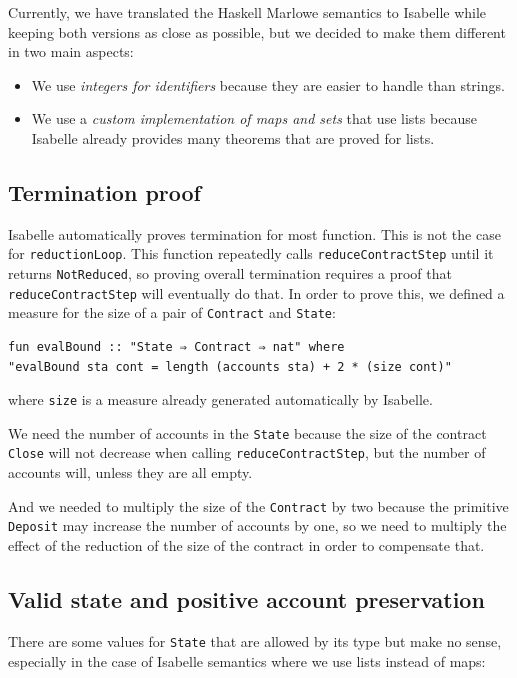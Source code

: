 \documentclass[runningheads]{llncs}
\begin{document}
Currently, we have translated the Haskell Marlowe semantics to Isabelle while keeping both versions as close as possible, but we decided to make them different in two main aspects:

\begin{itemize}
    \item We use \emph{integers for identifiers} because they are easier to handle than strings.
    \item We use a \emph{custom implementation of maps and sets} that use lists because Isabelle already provides many theorems that are proved for lists.
\end{itemize}

\subsection{Termination proof}

Isabelle automatically proves termination for most function. This is not the case for \texttt{reductionLoop}. This function repeatedly calls \texttt{reduceContractStep} until it returns \texttt{NotReduced}, so proving overall termination requires a proof that \texttt{reduceContractStep} will eventually do that. In order to prove this, we defined a measure for the size of a pair of \texttt{Contract} and \texttt{State}:

\begin{verbatim}
fun evalBound :: "State ⇒ Contract ⇒ nat" where
"evalBound sta cont = length (accounts sta) + 2 * (size cont)"
\end{verbatim}
\noindent
where \texttt{size} is a measure already generated automatically by Isabelle.

We need the number of accounts in the \texttt{State} because the size of the contract \texttt{Close} will not decrease when calling \texttt{reduceContractStep}, but the number of accounts will, unless they are all empty.

And we needed to multiply the size of the \texttt{Contract} by two because the primitive \texttt{Deposit} may increase the number of accounts by one, so we need to multiply the effect of the reduction of the size of the contract in order to compensate that.

\subsection{Valid state and positive account preservation\label{subsec:valid_state}}

There are some values for \texttt{State} that are allowed by its type but make no sense, especially in the case of Isabelle semantics where we use lists instead of maps:
\end{document}
